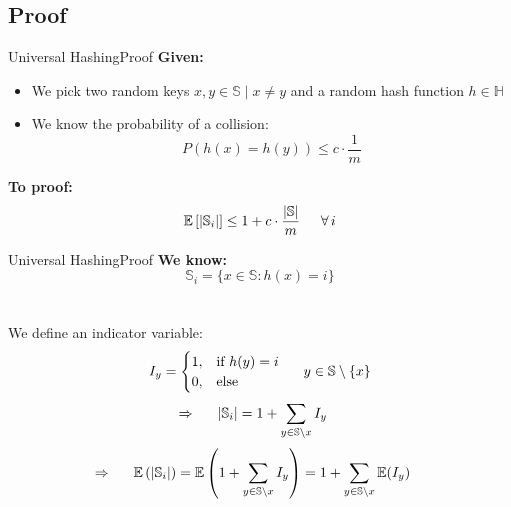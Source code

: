 
\subsection{Proof}
\def\E{\mathbb{E}}
\begin{frame}{Universal Hashing}{Proof}
  \textbf{Given:}
  \begin{itemize}
    \item<1->
      We pick two random keys
      {\color{MainA}$x, y \in \mathbb{S} \mid x \neq y$} and
      a random hash function {\color{MainA}$h \in \mathbb{H}$}
    \item<2->
      We know the probability of a collision:
      {\color{MainA}\[P(h(x) = h(y)) \leq c \cdot \frac{1}{m}\]}
  \end{itemize}
  \textbf{To proof:}
  {\color{MainA}\[\E\left[\vert \mathbb{S}_i \vert\right]
    \leq 1 + c \cdot \frac{\vert \mathbb{S} \vert}{m}
    \hspace*{1.5em} \forall \, i\]}
\end{frame}


\begin{frame}{Universal Hashing}{Proof}
  \textbf{We know:}
  {\color{MainA}\[\mathbb{S}_i = \{x \in \mathbb{S}: h(x) = i\}\]}\\
  \\[0.5em]
  We define an indicator variable:
  {\color{MainA}
  \begin{displaymath}
    I_y = \begin{cases}
      1, & \text{if } h(y) = i\\
      0, & \text{else}
    \end{cases} \hspace*{1.5em} y \in \mathbb{S} \setminus \{x\}
  \end{displaymath}
  \begin{align*}
    \Rightarrow \hspace{1.5em} \vert \mathbb{S}_i \vert
    & = 1 + \sum_{y \in \mathbb{S} \setminus x} I_y
  \end{align*}
  \begin{align*}
    \Rightarrow \hspace{1.5em} \E\left(\vert \mathbb{S}_i \vert\right)
      & = \E\left(1 + \sum_{y \in \mathbb{S} \setminus x} I_y\right)
        = 1 + \sum_{y \in \mathbb{S} \setminus x} \E(I_y)
  \end{align*}}
\end{frame}

